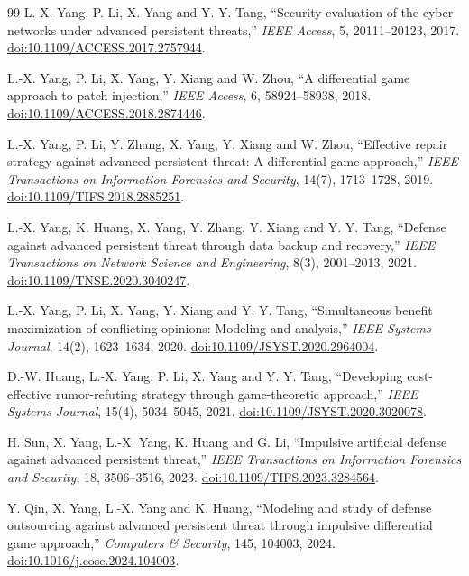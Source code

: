 \documentclass[11pt,a4paper]{article}
\theoremstyle{definition}
\theoremstyle{remark}
\begin{document}
\begin{thebibliography}{99}
 L.-X. Yang, P. Li, X. Yang and Y. Y. Tang, ``Security evaluation of the cyber networks under advanced persistent threats,'' \emph{IEEE Access}, 5, 20111--20123, 2017. \href{https://doi.org/10.1109/ACCESS.2017.2757944}{doi:10.1109/ACCESS.2017.2757944}.

 L.-X. Yang, P. Li, X. Yang, Y. Xiang and W. Zhou, ``A differential game approach to patch injection,'' \emph{IEEE Access}, 6, 58924--58938, 2018. \href{https://doi.org/10.1109/ACCESS.2018.2874446}{doi:10.1109/ACCESS.2018.2874446}.

 L.-X. Yang, P. Li, Y. Zhang, X. Yang, Y. Xiang and W. Zhou, ``Effective repair strategy against advanced persistent threat: A differential game approach,'' \emph{IEEE Transactions on Information Forensics and Security}, 14(7), 1713--1728, 2019. \href{https://doi.org/10.1109/TIFS.2018.2885251}{doi:10.1109/TIFS.2018.2885251}.

 L.-X. Yang, K. Huang, X. Yang, Y. Zhang, Y. Xiang and Y. Y. Tang, ``Defense against advanced persistent threat through data backup and recovery,'' \emph{IEEE Transactions on Network Science and Engineering}, 8(3), 2001--2013, 2021. \href{https://doi.org/10.1109/TNSE.2020.3040247}{doi:10.1109/TNSE.2020.3040247}.

 L.-X. Yang, P. Li, X. Yang, Y. Xiang and Y. Y. Tang, ``Simultaneous benefit maximization of conflicting opinions: Modeling and analysis,'' \emph{IEEE Systems Journal}, 14(2), 1623--1634, 2020. \href{https://doi.org/10.1109/JSYST.2020.2964004}{doi:10.1109/JSYST.2020.2964004}.

 D.-W. Huang, L.-X. Yang, P. Li, X. Yang and Y. Y. Tang, ``Developing cost-effective rumor-refuting strategy through game-theoretic approach,'' \emph{IEEE Systems Journal}, 15(4), 5034--5045, 2021. \href{https://doi.org/10.1109/JSYST.2020.3020078}{doi:10.1109/JSYST.2020.3020078}.

 H. Sun, X. Yang, L.-X. Yang, K. Huang and G. Li, ``Impulsive artificial defense against advanced persistent threat,'' \emph{IEEE Transactions on Information Forensics and Security}, 18, 3506--3516, 2023. \href{https://doi.org/10.1109/TIFS.2023.3284564}{doi:10.1109/TIFS.2023.3284564}.

 Y. Qin, X. Yang, L.-X. Yang and K. Huang, ``Modeling and study of defense outsourcing against advanced persistent threat through impulsive differential game approach,'' \emph{Computers \& Security}, 145, 104003, 2024. \href{https://doi.org/10.1016/j.cose.2024.104003}{doi:10.1016/j.cose.2024.104003}.


\end{thebibliography}
\end{document}
